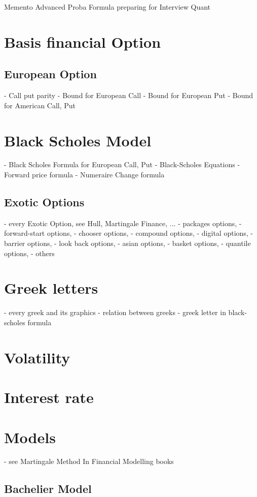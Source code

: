 \documentclass[a4paper,10pt]{article}
\begin{document}
\begin{center}Memento Advanced Proba Formula preparing for Interview Quant\end{center}
\section{Basis financial Option}
\subsection{European Option}
- Call put parity
- Bound for European Call
- Bound for European Put
- Bound for American Call, Put
\section{Black Scholes Model}
- Black Scholes Formula for European Call, Put
- Black-Scholes Equations
- Forward price formula
- Numeraire Change formula
\subsection{Exotic Options}
- every Exotic Option, see Hull, Martingale Finance, ...
- packages options, 
- forward-start options, 
- chooser options, 
- compound options, 
- digital options, 
- barrier options, 
- look back options, 
- asian options, 
- basket options, 
- quantile options, 
- others
\section{Greek letters}
- every greek and its graphics
- relation between greeks
- greek letter in black-scholes formula
\section{Volatility}
\section{Interest rate}
\section{Models}
- see Martingale Method In Financial Modelling books
\subsection{Bachelier Model}
\end{document}

